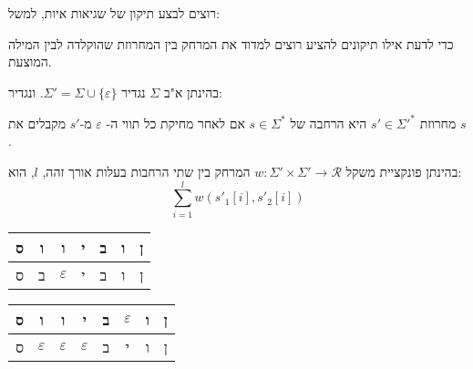 רוצים לבצע תיקון של שגיאות איות, למשל:
\begin{center}
\end{center}

כדי לדעת אילו תיקונים להציע רוצים למדוד את המרחק בין המחרוזת שהוקלדה לבין המילה המוצעת.

בהינתן א"ב 
$\Sigma$
נגדיר
$\Sigma' = \Sigma \cup \{\varepsilon\}$.
ונגדיר:
\begin{definition}[הרחבה]
מחרוזת
$s' \in \Sigma'^*$
היא הרחבה של
$s \in \Sigma^*$ 
אם לאחר מחיקת כל תווי ה-%
$\varepsilon$
מ-$s'$ מקבלים את $s$.
\end{definition}

בהינתן פונקציית משקל 
$w: \Sigma' \times \Sigma' \to \mathcal{R}$
המרחק בין שתי הרחבות בעלות אורך זהה, $l$, הוא:
$$\sum_{i = 1}^l w(s'_1[i], s'_2[i])$$

\begin{example}
\label{example:1}
\begin{tabular}{|c|c|c|c|c|c|c|}
\hline
ס & ו & ו & י & ב & ו & ן
\\\hline
ס & ב & $\varepsilon$ & י & ב & ו & ן
\\\hline
\end{tabular}
\end{example}

\begin{example}
\label{example:2}
\begin{tabular}{|c|c|c|c|c|c|c|c|}
\hline
ס 
& ו
& ו 
& י 
& ב
& $\varepsilon$  
& ו 
& ן
\\\hline
ס 
& $\varepsilon$ 
& $\varepsilon$ 
& $\varepsilon$ 
& ב 
& י 
& ו 
& ן
\\\hline
\end{tabular}
\end{example}

